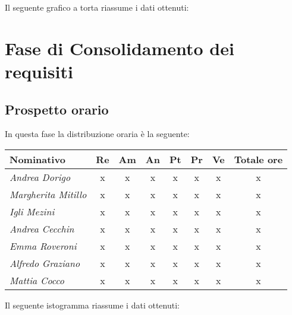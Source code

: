 {{Il seguente grafico a torta riassume i dati ottenuti:

\section{Fase di Consolidamento dei requisiti}\label{5.2}

\subsection{Prospetto orario}\label{5.2.1}
In questa fase la distribuzione oraria è la seguente:
\quad
\def\tabularxcolumn#1{m{#1}}
{
	
	\begin{center}
		\renewcommand{\arraystretch}{1.4}
		\begin{tabularx}{\textwidth}{|X|c|c|c|c|c|c|c|}
			\hline
			\rowcolor{airforceblue}
			\textbf{Nominativo} & \textbf{Re} & \textbf{Am} & \textbf{An} & \textbf{Pt} & \textbf{Pr} & \textbf{Ve} & \textbf{Totale ore}\\
			\hline
			\textit{Andrea Dorigo} & x & x & x & x & x & x & x\\
			\hline
			\textit{Margherita Mitillo} & x & x & x & x & x & x & x\\
			\hline
			\textit{Igli Mezini} & x & x & x & x & x & x & x\\
			\hline
			\textit{Andrea Cecchin} & x & x & x & x & x & x & x\\
			\hline
			\textit{Emma Roveroni} & x & x & x & x & x & x & x\\
			\hline
			\textit{Alfredo Graziano} & x & x & x & x & x & x & x\\
			\hline
			\textit{Mattia Cocco} & x & x & x & x & x & x & x\\
			\hline
		\end{tabularx}
	\end{center}

Il seguente istogramma riassume i dati ottenuti:

}}}
